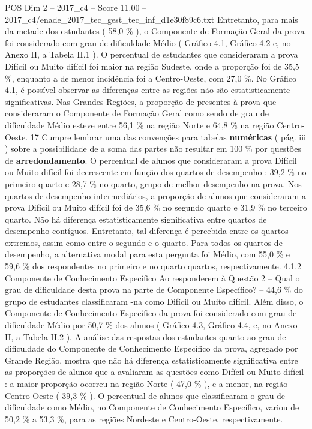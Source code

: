 \begin{textsample}{POS Dim 2 – 2017\_c4 – Score 11.00 – 2017\_c4/enade\_2017\_tec\_gest\_tec\_inf\_d1e30f89c6.txt}
Entretanto, para mais da metade dos estudantes ( 58,0 \% ), o Componente de Formação Geral da prova foi considerado com grau de dificuldade Médio ( Gráfico 4.1, Gráfico 4.2 e, no Anexo II, a Tabela II.1 ).
O percentual de estudantes que consideraram a prova Difícil ou Muito difícil foi maior na região Sudeste, onde a proporção foi de 35,5 \%, enquanto a de menor incidência foi a Centro-Oeste, com 27,0 \%.
No Gráfico 4.1, é possível observar as diferenças entre as regiões não são estatisticamente significativas.
Nas Grandes Regiões, a proporção de presentes à prova que consideraram o Componente de Formação Geral como sendo de grau de dificuldade Médio esteve entre 56,1 \% na região Norte e 64,8 \% na região Centro-Oeste. 17 Cumpre lembrar uma das convenções para tabelas \textbf{numéricas} ( pág. iii ) sobre a possibilidade de a soma das partes não resultar em 100 \% por questões de \textbf{arredondamento}.
O percentual de alunos que consideraram a prova Difícil ou Muito difícil foi decrescente em função dos quartos de desempenho : 39,2 \% no primeiro quarto e 28,7 \% no quarto, grupo de melhor desempenho na prova.
Nos quartos de desempenho intermediários, a proporção de alunos que consideraram a prova Difícil ou Muito difícil foi de 35,6 \% no segundo quarto e 31,9 \% no terceiro quarto.
Não há diferença estatisticamente significativa entre quartos de desempenho contíguos.
Entretanto, tal diferença é percebida entre os quartos extremos, assim como entre o segundo e o quarto.
Para todos os quartos de desempenho, a alternativa modal para esta pergunta foi Médio, com 55,0 \% e 59,6 \% dos respondentes no primeiro e no quarto quartos, respectivamente. 4.1.2 Componente de Conhecimento Específico Ao responderem à Questão 2 – Qual o grau de dificuldade desta prova na parte de Componente Específico? – 44,6 \% do grupo de estudantes classificaram -na como Difícil ou Muito difícil.
Além disso, o Componente de Conhecimento Específico da prova foi considerado com grau de dificuldade Médio por 50,7 \% dos alunos ( Gráfico 4.3, Gráfico 4.4, e, no Anexo II, a Tabela II.2 ).
A análise das respostas dos estudantes quanto ao grau de dificuldade do Componente de Conhecimento Específico da prova, agregado por Grande Região, mostra que não há diferença estatisticamente significativa entre as proporções de alunos que a avaliaram as questões como Difícil ou Muito difícil : a maior proporção ocorreu na região Norte ( 47,0 \% ), e a menor, na região Centro-Oeste ( 39,3 \% ).
O percentual de alunos que classificaram o grau de dificuldade como Médio, no Componente de Conhecimento Específico, variou de 50,2 \% a 53,3 \%, para as regiões Nordeste e Centro-Oeste, respectivamente.

\end{textsample}
